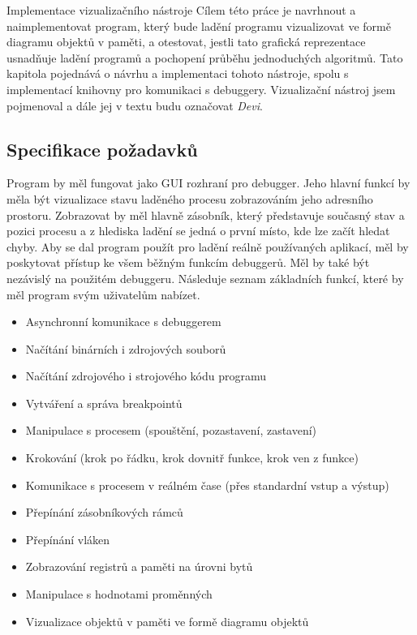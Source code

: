 \documentclass[czech,bachelor,male,python,dept460,hidelinks]{diploma}						%
\begin{document}
\begin{section}{Implementace vizualizačního nástroje}
\label{sec:DeviImplementation}
  Cílem této práce je navrhnout a naimplementovat program, který bude ladění programu vizualizovat ve formě diagramu objektů v paměti, a otestovat,
	jestli tato grafická reprezentace usnadňuje ladění programů a pochopení průběhu jednoduchých algoritmů.
	Tato kapitola pojednává o návrhu a implementaci tohoto nástroje, spolu s implementací knihovny pro komunikaci s debuggery.
	Vizualizační nástroj jsem pojmenoval a dále jej v textu budu označovat \textit{Devi}.
	
	\subsection{Specifikace požadavků}
	Program by měl fungovat jako GUI rozhraní pro debugger. Jeho hlavní funkcí by měla být vizualizace stavu laděného procesu zobrazováním jeho
	adresního prostoru. Zobrazovat by měl hlavně zásobník, který představuje současný stav a pozici procesu a z hlediska ladění se jedná o první místo,
	kde lze začít hledat chyby.
	Aby se dal program použít pro ladění reálně používaných aplikací, měl by poskytovat přístup ke všem běžným
	funkcím debuggerů. Měl by také být nezávislý na použitém debuggeru. Následuje seznam základních funkcí, které by měl program svým uživatelům nabízet.
	
	\begin{itemize}
		\item Asynchronní komunikace s debuggerem
		\item Načítání binárních i zdrojových souborů
		\item Načítání zdrojového i strojového kódu programu
		\item Vytváření a správa breakpointů
		\item Manipulace s procesem (spouštění, pozastavení, zastavení)
		\item Krokování (krok po řádku, krok dovnitř funkce, krok ven z funkce)
		\item Komunikace s procesem v reálném čase (přes standardní vstup a výstup)
		\item Přepínání zásobníkových rámců
		\item Přepínání vláken
		\item Zobrazování registrů a paměti na úrovni bytů
		\item Manipulace s hodnotami proměnných
		\item Vizualizace objektů v paměti ve formě diagramu objektů
	\end{itemize}
	

\end{section}
\end{document}
